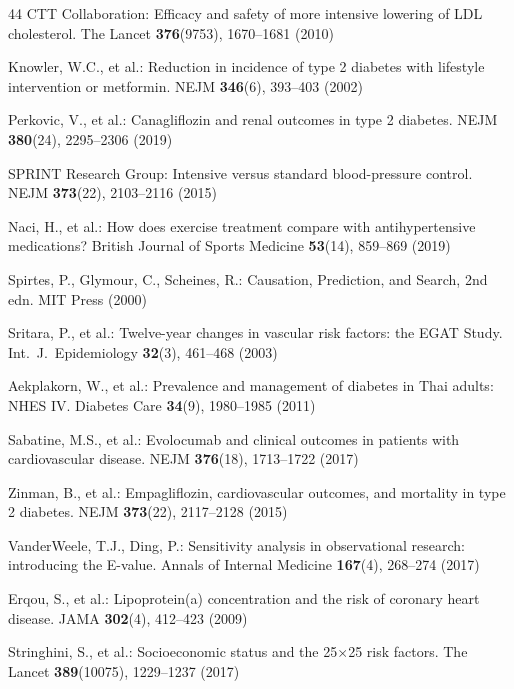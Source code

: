 \documentclass[runningheads]{llncs}
\begin{document}
\begin{thebibliography}{44}
CTT Collaboration:
Efficacy and safety of more intensive lowering of LDL cholesterol.
The Lancet \textbf{376}(9753), 1670--1681 (2010)

Knowler, W.C., et al.:
Reduction in incidence of type 2 diabetes with lifestyle intervention or metformin.
NEJM \textbf{346}(6), 393--403 (2002)

Perkovic, V., et al.:
Canagliflozin and renal outcomes in type 2 diabetes.
NEJM \textbf{380}(24), 2295--2306 (2019)

SPRINT Research Group:
Intensive versus standard blood-pressure control.
NEJM \textbf{373}(22), 2103--2116 (2015)

Naci, H., et al.:
How does exercise treatment compare with antihypertensive medications?
British Journal of Sports Medicine \textbf{53}(14), 859--869 (2019)

Spirtes, P., Glymour, C., Scheines, R.:
Causation, Prediction, and Search, 2nd edn.
MIT Press (2000)

Sritara, P., et al.:
Twelve-year changes in vascular risk factors: the EGAT Study.
Int.\ J.\ Epidemiology \textbf{32}(3), 461--468 (2003)

Aekplakorn, W., et al.:
Prevalence and management of diabetes in Thai adults: NHES IV.
Diabetes Care \textbf{34}(9), 1980--1985 (2011)

Sabatine, M.S., et al.:
Evolocumab and clinical outcomes in patients with cardiovascular disease.
NEJM \textbf{376}(18), 1713--1722 (2017)

Zinman, B., et al.:
Empagliflozin, cardiovascular outcomes, and mortality in type 2 diabetes.
NEJM \textbf{373}(22), 2117--2128 (2015)

VanderWeele, T.J., Ding, P.:
Sensitivity analysis in observational research: introducing the E-value.
Annals of Internal Medicine \textbf{167}(4), 268--274 (2017)

Erqou, S., et al.:
Lipoprotein(a) concentration and the risk of coronary heart disease.
JAMA \textbf{302}(4), 412--423 (2009)

Stringhini, S., et al.:
Socioeconomic status and the 25$\times$25 risk factors.
The Lancet \textbf{389}(10075), 1229--1237 (2017)


\end{thebibliography}
\end{document}
